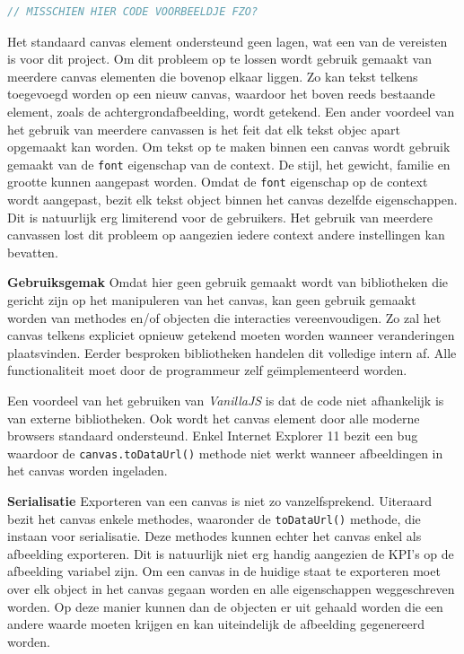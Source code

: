 \begin{lstlisting}[language=javascript]
// MISSCHIEN HIER CODE VOORBEELDJE FZO?
\end{lstlisting}

Het standaard canvas element ondersteund geen lagen, wat een van de vereisten is voor dit project. Om dit probleem op te lossen wordt gebruik gemaakt van meerdere canvas elementen die bovenop elkaar liggen. Zo kan tekst telkens toegevoegd worden op een nieuw canvas, waardoor het boven reeds bestaande element, zoals de achtergrondafbeelding, wordt getekend. Een ander voordeel van het gebruik van meerdere canvassen is het feit dat elk tekst objec apart opgemaakt kan worden. Om tekst op te maken binnen een canvas wordt gebruik gemaakt van de \lstinline{font} eigenschap van de context. De stijl, het gewicht, familie en grootte kunnen aangepast worden. Omdat de \lstinline{font} eigenschap op de context wordt aangepast, bezit elk tekst object binnen het canvas dezelfde eigenschappen. Dit is natuurlijk erg limiterend voor de gebruikers. Het gebruik van meerdere canvassen lost dit probleem op aangezien iedere context andere instellingen kan bevatten.  

\textbf{Gebruiksgemak} \break
Omdat hier geen gebruik gemaakt wordt van bibliotheken die gericht zijn op het manipuleren van het canvas, kan geen gebruik gemaakt worden van methodes en/of objecten die interacties vereenvoudigen. Zo zal het canvas telkens expliciet opnieuw getekend moeten worden wanneer veranderingen plaatsvinden. Eerder besproken bibliotheken handelen dit volledige intern af. Alle functionaliteit moet door de programmeur zelf ge\"{\i}mplementeerd worden. 

Een voordeel van het gebruiken van \textit{VanillaJS} is dat de code niet afhankelijk is van externe bibliotheken. Ook wordt het canvas element door alle moderne browsers standaard ondersteund. Enkel Internet Explorer 11 bezit een bug waardoor de  \lstinline{canvas.toDataUrl()} methode niet werkt wanneer afbeeldingen in het canvas worden ingeladen. %

\textbf{Serialisatie} \break
Exporteren van een canvas is niet zo vanzelfsprekend. Uiteraard bezit het canvas enkele methodes, waaronder de \lstinline{toDataUrl()} methode, die instaan voor serialisatie. Deze methodes kunnen echter het canvas enkel als afbeelding exporteren. Dit is natuurlijk niet erg handig aangezien de KPI's op de afbeelding variabel zijn. Om een canvas in de huidige staat te exporteren moet over elk object in het canvas gegaan worden en alle eigenschappen weggeschreven worden. Op deze manier kunnen dan de objecten er uit gehaald worden die een andere waarde moeten krijgen en kan uiteindelijk de afbeelding gegenereerd worden. 

